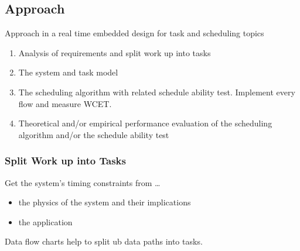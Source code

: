 \subsection{Approach}
Approach in a real time embedded design for task and scheduling topics
\begin{enumerate}
	\item Analysis of requirements and split work up into tasks
	\item The system and task model
	\item The scheduling algorithm with related schedule ability test.
	      Implement every flow and measure WCET.
	\item Theoretical and/or empirical performance evaluation of the scheduling algorithm and/or the schedule ability test
\end{enumerate}

\subsubsection{Split Work up into Tasks}
Get the system's timing constraints from \ldots
\begin{itemize}[label=\ldots]
	\item the physics of the system and their implications
	\item the application
\end{itemize}
Data flow charts help to split ub data paths into tasks.

